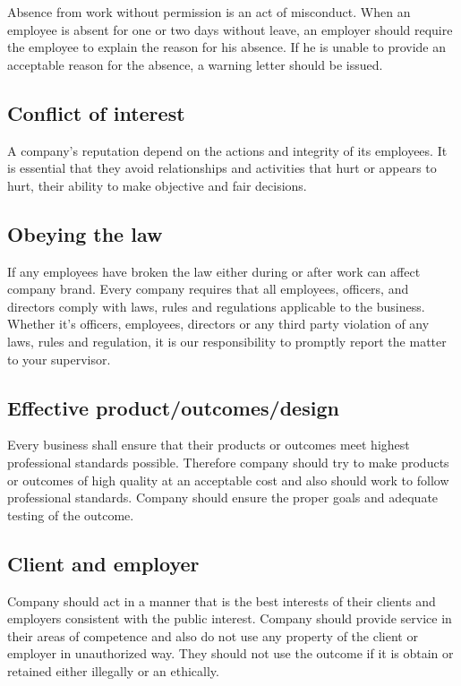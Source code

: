 \documentclass[12pt,a4paper,oneside]{article}
\begin{document}
Absence from work without permission is an act of misconduct. When an employee is
absent for one or two days without leave, an employer should require the employee to
explain the reason for his absence. If he is unable to provide an acceptable reason for the
absence, a warning letter should be issued.

\subsection{Conflict of interest}
A company's reputation depend on the actions and integrity of its employees. It is essential
that they avoid relationships and activities that hurt or appears to hurt, their ability to make
objective and fair decisions.


\subsection{Obeying the law}

If any employees have broken the law either during or after work can affect company brand. Every company requires that all employees, officers, and directors comply with laws, rules and regulations applicable to the business. Whether it's officers, employees, directors or any third party violation of any laws, rules and regulation, it is our responsibility to promptly report the matter to your supervisor.

\subsection{Effective product/outcomes/design}
Every business shall ensure that their products or outcomes meet highest professional standards possible. Therefore company should try to make products or outcomes of high quality at an acceptable cost and also should work to follow professional standards.  Company should ensure the proper goals and adequate testing of the outcome.

\subsection{Client and employer}

Company should act in a manner that is the best interests of their clients and employers consistent with the public interest. Company should provide service in their areas of competence and also do not use any property of the client or employer in unauthorized way.  They should not use the outcome if it is obtain or retained either illegally or an ethically.
\end{document}
